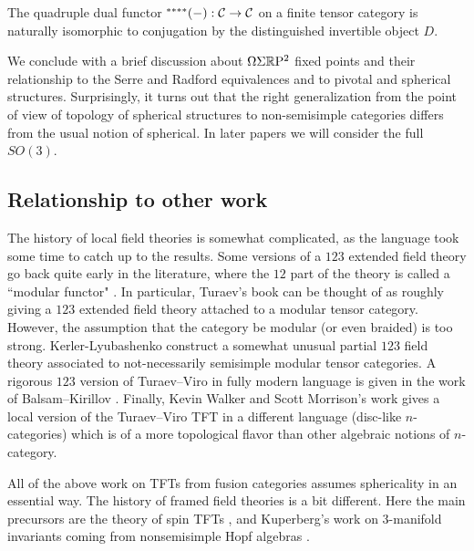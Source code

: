 \documentclass{amsart}
\begin{document}
\begin{maincor} \label{cor8}
The quadruple dual functor ${}^{****}(-): \mathcal C \rightarrow \mathcal C$ on a finite tensor category is naturally isomorphic to conjugation by the distinguished invertible object $D$.
\end{maincor}

We conclude with a brief discussion about $\Omega \Sigma \mathbb R \mathrm{P}^2$ fixed points and their relationship to the Serre and Radford equivalences and to pivotal and spherical structures.  Surprisingly, it turns out that the right generalization from the point of view of topology of spherical structures to non-semisimple categories differs from the usual notion of spherical.  In later papers we will consider the full $SO(3)$.


\subsection*{Relationship to other work}

The history of local field theories is somewhat complicated, as the language took some time to catch up to the results.  Some versions of a $123$ extended field theory go back quite early in the literature, where the $12$ part of the theory is called a ``modular functor" \cite{Segal, MR1002038, MR1159969,MR1797619}.  In particular, Turaev's book \cite{MR1292673} can be thought of as roughly giving a $123$ extended field theory attached to a modular tensor category.  However, the assumption that the category be modular (or even braided) is too strong.  Kerler-Lyubashenko \cite{MR1862634} construct a somewhat unusual partial $123$ field theory associated to not-necessarily semisimple modular tensor categories.   A rigorous $123$ version of Turaev--Viro in fully modern language is given in the work of Balsam--Kirillov \cite{1004.1533}.  Finally, Kevin Walker and Scott Morrison's work \cite{kw:tqft, 1009.5025} gives a local version of the Turaev--Viro TFT in a different language (disc-like $n$-categories) which is of a more topological flavor than other algebraic notions of $n$-category.

All of the above work on TFTs from fusion categories assumes sphericality in an essential way.  The history of framed field theories is a bit different.  Here the main precursors are the theory of spin TFTs \cite{MR1117149, MR1171303, MR1387228, MR1880321}, and Kuperberg's work on $3$-manifold invariants coming from nonsemisimple Hopf algebras \cite{MR1394749}.
\end{document}
